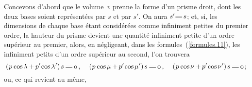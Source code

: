 \documentclass[11pt, twoside, leqno]{article}
\renewcommand{\eqref}[1]{(\ref{#1})}
\newcommand\equals{\scalebox{1.5}[1]{$=$}}
\newcommand\cosine{\operatorname{cos} \hspace{-0.1ex}}
\begin{document}
Concevons d'abord que le volume~\;$v$\; prenne la forme d'un prisme droit, dont les deux bases soient représentées par \;$s$\; et par \;$s'$.\hspace{.5ex} On aura \;${s' \equals \hspace{.2ex} s}$\hspace{.3ex};\hspace{.7ex} et, si, les dimensions de chaque base étant considérées comme infiniment petites du premier ordre, la hauteur du prisme devient une quantité infiniment petite d'un ordre supérieur au premier, alors, en négligeant, dans les formules~\eqref{formules.11}, les infiniment petits d'un ordre supérieur au second, l'on trouvera
\begin{equation*}
(\hspace{.1ex} p \hspace{.1ex} \cosine \lambda + \hspace{-.15ex} p' \hspace{-.2ex} \cosine \lambda\hspace{.1ex}' ) \hspace{1.2pt} s \hspace{.4ex} \equals \hspace{.3ex} \text{o}
\hspace{.4ex} \text{,}
\hspace{1.3em}
(\hspace{.1ex} p \hspace{.1ex} \cosine \mu + \hspace{-.15ex} p' \hspace{-.2ex} \cosine \mu\hspace{.1ex}' ) \hspace{1.2pt} s \hspace{.4ex} \equals \hspace{.3ex} \text{o}
\hspace{.4ex} \text{,}
\hspace{1.3em}
(\hspace{.1ex} p \hspace{.1ex} \cosine \nu + \hspace{-.15ex} p' \hspace{-.2ex} \cosine \nu\hspace{.1ex}' ) \hspace{1.2pt} s \hspace{.4ex} \equals \hspace{.3ex} \text{o}
\hspace{.3ex} \text{;}
\end{equation*}
ou, ce qui revient au même,
\end{document}
